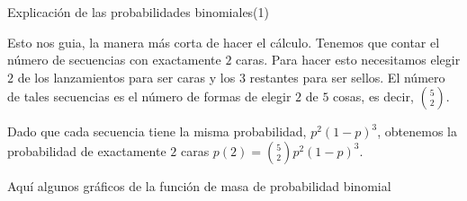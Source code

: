 \documentclass[10pt]{beamer}
\begin{document}
\begin{frame}{Explicaci\'on de las probabilidades binomiales(1)}
\small{Esto nos guia, la manera m\'as corta de hacer el c\'alculo. Tenemos que contar el n\'umero de secuencias con exactamente $2$ caras. Para hacer esto necesitamos elegir $2$ de los lanzamientos para ser caras y los $3$ restantes para ser sellos. El n\'umero de tales secuencias es el n\'umero de formas de  elegir $2$ de $5$ cosas, es decir, $\binom{5}{2}$.
	
Dado que cada secuencia tiene la misma probabilidad, $p^2(1 - p)^3$, obtenemos la probabilidad de exactamente $2$ caras $p(2) = \binom{5}{2}p^2(1 - p)^3$.


\vspace{0.3cm}
	
Aqu\'i algunos gr\'aficos de la  funci\'on de masa de probabilidad binomial}	


\end{frame}
\end{document}
